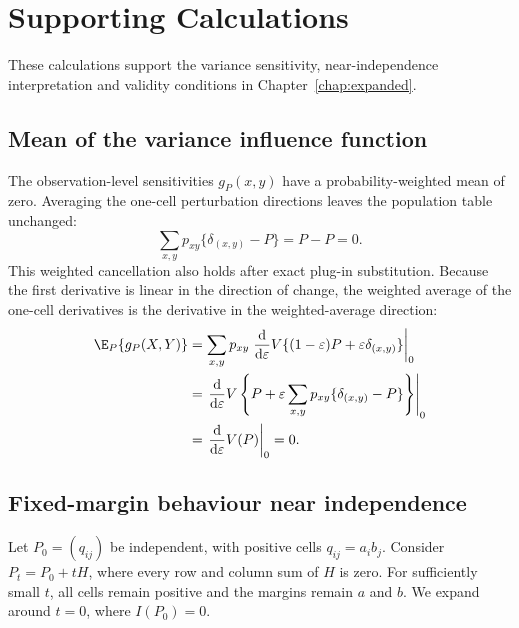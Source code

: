 \chapter{Supporting Calculations}
\label{app:derivation-details}

These calculations support the variance sensitivity, near-independence
interpretation and validity conditions in Chapter~\ref{chap:expanded}.

\section{Mean of the variance influence function}

The observation-level sensitivities \(g_P(x,y)\) have a probability-weighted
mean of zero. Averaging the one-cell perturbation directions leaves the
population table unchanged:
\begin{equation}
  \sum_{x,y}p_{xy}\{\delta_{(x,y)}-P\}=P-P=0.
\end{equation}
This weighted cancellation also holds after exact plug-in substitution.
Because the first derivative is linear in the direction of change, the
weighted average of the one-cell derivatives is the derivative in the
weighted-average direction:
\begin{align}
  \E_P\{g_P(X,Y)\}
  &=\sum_{x,y}p_{xy}
    \left.\frac{\mathrm d}{\mathrm d\varepsilon}
    V\{(1-\varepsilon)P+\varepsilon\delta_{(x,y)}\}
    \right|_{0}\\
  &=\left.\frac{\mathrm d}{\mathrm d\varepsilon}
    V\left\{P+\varepsilon
    \sum_{x,y}p_{xy}\{\delta_{(x,y)}-P\}\right\}
    \right|_{0}\\
  &=\left.\frac{\mathrm d}{\mathrm d\varepsilon}V(P)
    \right|_{0}=0.
\end{align}
\begin{samepage}
\section{Fixed-margin behaviour near independence}
\label{sec:fixed-margin-local-derivation}

Let \(P_0=(q_{ij})\) be independent, with positive cells
\(q_{ij}=a_i b_j\). Consider \(P_t=P_0+tH\), where every row and column
sum of \(H\) is zero. For sufficiently small \(t\), all cells remain
positive and the margins remain \(a\) and \(b\). We expand around
\(t=0\), where \(I(P_0)=0\).
\par
\end{samepage}


